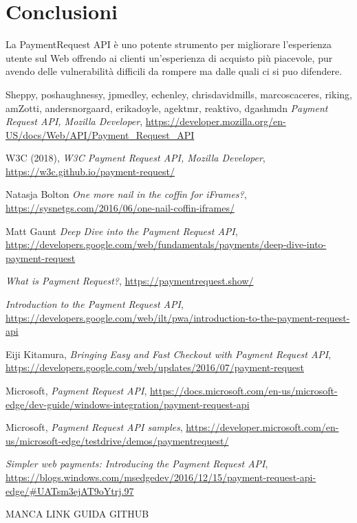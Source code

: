 \documentclass[11pt ,a4paper , twoside , openright ]{article}
\begin{document}
	\section{Conclusioni}
	La PaymentRequest API è uno potente strumento per migliorare l'esperienza utente sul Web offrendo ai clienti un'esperienza di acquisto più piacevole, pur avendo delle vulnerabilità difficili da rompere ma dalle quali ci si puo difendere.
	\newpage
	\begin{thebibliography}{99}
		\bibitem{}
		Sheppy, poshaughnessy, jpmedley, echenley, chrisdavidmills, marcoscaceres, riking, amZotti, andersnorgaard, erikadoyle, agektmr, reaktivo, dgashmdn
		\emph{Payment Request API, Mozilla Developer},
		\url{https://developer.mozilla.org/en-US/docs/Web/API/Payment_Request_API}
		
		\bibitem{}
		W3C (2018),
		\emph{W3C Payment Request API, Mozilla Developer},
		\url{https://w3c.github.io/payment-request/}
		
		\bibitem{}
		Natasja Bolton
		\emph{One more nail in the coffin for iFrames?}, 
		\url{https://sysnetgs.com/2016/06/one-nail-coffin-iframes/}
		
		\bibitem{}
		Matt Gaunt
		\emph{Deep Dive into the Payment Request API}, 
		\url{https://developers.google.com/web/fundamentals/payments/deep-dive-into-payment-request}
		
		\bibitem{}
		\emph{What is Payment Request?},
		\url{https://paymentrequest.show/}
		
		\bibitem{}
		\emph{Introduction to the Payment Request API},
		\url{https://developers.google.com/web/ilt/pwa/introduction-to-the-payment-request-api}
		
		\bibitem{}
		Eiji Kitamura,
		\emph{Bringing Easy and Fast Checkout with Payment Request API},
		\url{https://developers.google.com/web/updates/2016/07/payment-request}
		
		\bibitem{}
		Microsoft,
		\emph{Payment Request API},
		\url{https://docs.microsoft.com/en-us/microsoft-edge/dev-guide/windows-integration/payment-request-api}
		
		\bibitem{}
		Microsoft,
		\emph{Payment Request API samples},
		\url{https://developer.microsoft.com/en-us/microsoft-edge/testdrive/demos/paymentrequest/}
		
		\bibitem{}
		\emph{Simpler web payments: Introducing the Payment Request API},
		\url{https://blogs.windows.com/msedgedev/2016/12/15/payment-request-api-edge/#UATsm3ejAT9oYtrj.97}
		
		\bibitem{}
		MANCA LINK GUIDA GITHUB
	\end{thebibliography}
	\newpage
	\listoffigures
\end{document}
